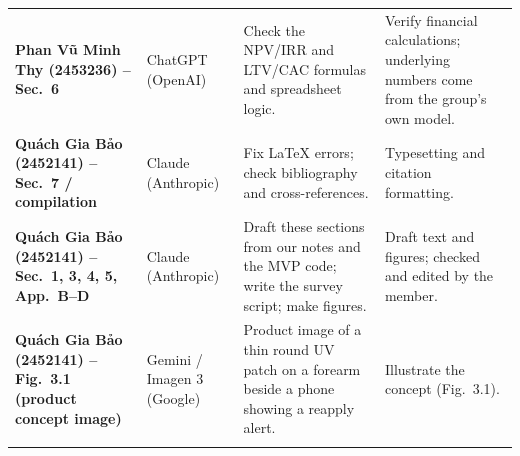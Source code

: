 \begin{singlespace}
\begin{longtable}{@{}L{3.0cm}L{2.4cm}L{5.0cm}L{4.0cm}@{}}
  \addlinespace
  \textbf{Phan Vũ Minh Thy (2453236) -- Sec.~6} & ChatGPT (OpenAI) & Check the NPV/IRR and LTV/CAC formulas and spreadsheet logic. & Verify financial calculations; underlying numbers come from the group's own model.\\
  \addlinespace
  \textbf{Quách Gia Bảo (2452141) -- Sec.~7 / compilation} & Claude (Anthropic) & Fix LaTeX errors; check bibliography and cross-references. & Typesetting and citation formatting.\\
  \addlinespace
  \textbf{Quách Gia Bảo (2452141) -- Sec.~1, 3, 4, 5, App.~B--D} & Claude (Anthropic) & Draft these sections from our notes and the MVP code; write the survey script; make figures. & Draft text and figures; checked and edited by the member.\\
  \addlinespace
  \textbf{Quách Gia Bảo (2452141) -- Fig.~3.1 (product concept image)} & Gemini / Imagen 3 (Google) & Product image of a thin round UV patch on a forearm beside a phone showing a reapply alert. & Illustrate the concept (Fig.~3.1).\\
  \addlinespace
\end{longtable}
\end{singlespace}

